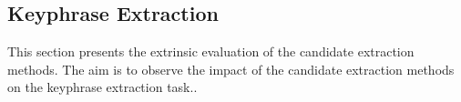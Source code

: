 
  \subsection{Keyphrase Extraction}
  \label{subsec:keyphrase_extraction}
    This section presents the extrinsic evaluation of the candidate extraction
    methods. The aim is to observe the impact of the candidate extraction
    methods on the keyphrase extraction task..

